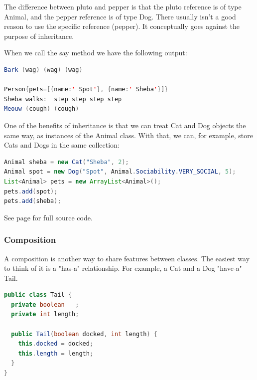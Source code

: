 The difference between pluto and pepper is that the pluto reference is of type Animal, and the pepper reference is of type Dog. There usually isn't a good reason to use the specific reference (pepper). It conceptually goes against the purpose of inheritance.

When we call the say method we have the following output:
\begin{lstlisting}[language=Java]
Bark (wag) (wag) (wag)

Person{pets=[{name:' Spot'}, {name:' Sheba'}]}
Sheba walks:  step step step step
Meouw (cough) (cough)
\end{lstlisting}

One of the benefits of inheritance is that we can treat Cat and Dog objects the same way, as instances of the Animal class. With that, we can, for example, store Cats and Dogs in the same collection:
\begin{lstlisting}[language=Java]
Animal sheba = new Cat("Sheba", 2);
Animal spot = new Dog("Spot", Animal.Sociability.VERY_SOCIAL, 5);
List<Animal> pets = new ArrayList<Animal>();
pets.add(spot);
pets.add(sheba);
\end{lstlisting}

See page \pageref{App:AppendixJInheritance} for full source code.

\subsubsection{Composition}

A composition is another way to share features between classes. The easiest way to think of it is a "has-a" relationship. For example, a Cat and a Dog "have-a" Tail.

\begin{lstlisting}[language=Java]
public class Tail {
  private boolean 	;
  private int length;

  public Tail(boolean docked, int length) {
    this.docked = docked;
    this.length = length;
  }
}
\end{lstlisting}

